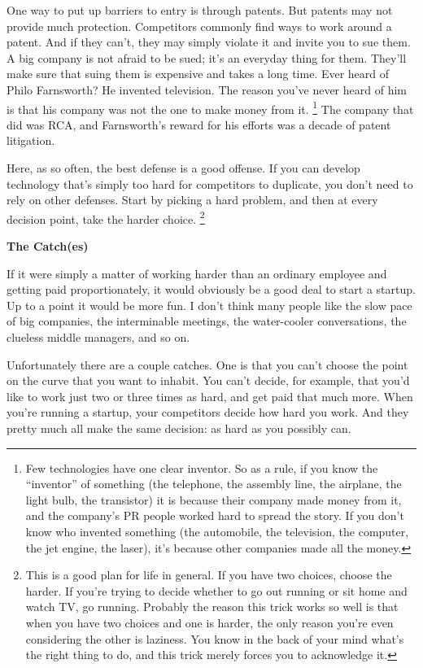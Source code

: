 One way to put up barriers to entry is through patents. But patents may
not provide much protection. Competitors commonly find ways to work
around a patent. And if they can't, they may simply violate it and
invite you to sue them. A big company is not afraid to be sued; it's an
everyday thing for them. They'll make sure that suing them is expensive
and takes a long time. Ever heard of Philo Farnsworth? He invented
television. The reason you've never heard of him is that his company was
not the one to make money from it. \footnote{Few technologies have one clear inventor. So as a rule, if you
know the ``inventor'' of something (the telephone, the assembly line,
the airplane, the light bulb, the transistor) it is because their
company made money from it, and the company's PR people worked hard to
spread the story. If you don't know who invented something (the
automobile, the television, the computer, the jet engine, the laser),
it's because other companies made all the money.} The company
that did was RCA, and Farnsworth's reward for his efforts was a decade
of patent litigation.

Here, as so often, the best defense is a good offense. If you can
develop technology that's simply too hard for competitors to duplicate,
you don't need to rely on other defenses. Start by picking a hard
problem, and then at every decision point, take the harder choice.
\footnote{This is a good plan for life in general. If you have two
choices, choose the harder. If you're trying to decide whether to go out
running or sit home and watch TV, go running. Probably the reason this
trick works so well is that when you have two choices and one is harder,
the only reason you're even considering the other is laziness. You know
in the back of your mind what's the right thing to do, and this trick
merely forces you to acknowledge it.}

\textbf{The Catch(es)}

If it were simply a matter of working harder than an ordinary employee
and getting paid proportionately, it would obviously be a good deal to
start a startup. Up to a point it would be more fun. I don't think many
people like the slow pace of big companies, the interminable meetings,
the water-cooler conversations, the clueless middle managers, and so on.

Unfortunately there are a couple catches. One is that you can't choose
the point on the curve that you want to inhabit. You can't decide, for
example, that you'd like to work just two or three times as hard, and
get paid that much more. When you're running a startup, your competitors
decide how hard you work. And they pretty much all make the same
decision: as hard as you possibly can.

